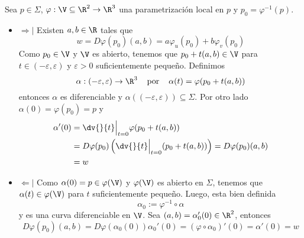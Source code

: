\documentclass{article}
\begin{document}
\begin{dem} Sea $p\in\Sigma$, $\varphi:\V\subseteq\R^{2}\to\R^{3}$ una parametrización local en 
    $p$ y $p_{0}=\varphi^{-1}(p)$.
    \begin{itemize}
        \item $\Rightarrow|$ Existen $a,b\in\R$ tales que
        \begin{equation*}
            w=D\varphi(p_{0})(a,b)=a\varphi_{u}(p_{0})+b\varphi_{v}(p_{0})
        \end{equation*}
        Como $p_{0}\in\V$ y $\V$ es abierto, tenemos que $p_{0}+t(a,b)\in\V$ para 
        $t\in(-\varepsilon,\varepsilon)$ y $\varepsilon>0$ suficientemente pequeño. Definimos
        \begin{equation*}
            \alpha:(-\varepsilon,\varepsilon)\to\R^{3}\hspace{4mm}\text{por}\hspace{4mm}
            \alpha(t)=\varphi(p_{0}+t(a,b))
        \end{equation*}
        entonces $\alpha$ es diferenciable y $\alpha((-\varepsilon,\varepsilon))\subseteq\Sigma$.
        Por otro lado $\alpha(0)=\varphi(p_{0})=p$ y
        \begin{align*}
            \alpha'(0) &= \dv{}{t}\Big|_{t=0}\varphi(p_{0}+t(a,b)) \\
            &= D\varphi(p_{0})\left(\dv{}{t}\Big|_{t=0}(p_{0}+t(a,b))\right)=
            D\varphi(p_{0})(a,b) \\
            &= w
        \end{align*}

        \item $\Leftarrow|$ Como $\alpha(0)=p\in\varphi(\V)$ y $\varphi(\V)$ es abierto en 
        $\Sigma$, tenemos que $\alpha(t)\in\varphi(\V)$ para $t$ suficientemente pequeño. Luego,
        esta bien definida
        \begin{equation*}
            \alpha_{0}:=\varphi^{-1}\circ\alpha
        \end{equation*}
        y es una curva diferenciable en $\V$. Sea $(a,b)=\alpha_{0}'(0)\in\R^{2}$, entonces
        \begin{equation*}
            D\varphi(p_{0})(a,b)=D\varphi(\alpha_{0}(0))\alpha_{0}'(0)=
            (\varphi\circ\alpha_{0})'(0)=\alpha'(0)=w
        \end{equation*}
    \end{itemize}
\end{dem}
\end{document}
